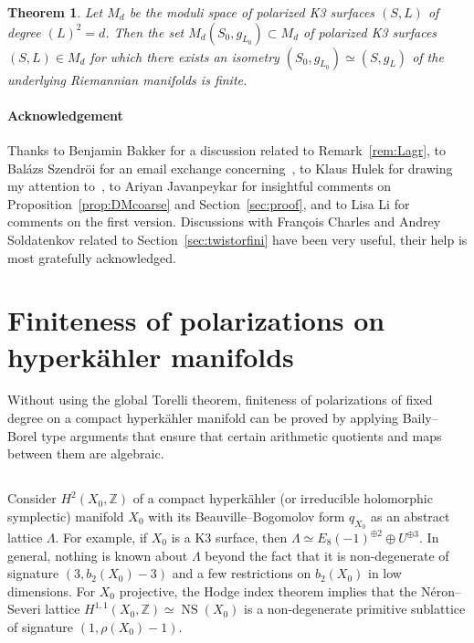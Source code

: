 \documentclass[11pt]{article}
\newtheorem{theo}{Theorem}[section]
\theoremstyle{definition}
\numberwithin{equation}{section}
\numberwithin{figure}{section}
\numberwithin{table}{section}
\DeclareMathOperator{\NS}{NS}
\newcommand{\ZZ}{\mathbb{Z}}
\renewcommand{\cong}{\simeq}
\begin{document}
\begin{theo}
Let $M_d$ be the moduli space of polarized K3 surfaces $(S,L)$ of degree $(L)^2=d$. Then the set $M_d(S_0,g_{L_0})\subset M_d$ of polarized K3 surfaces $(S,L)\in M_d$ for which there exists an isometry $(S_0,g_{L_0})\cong (S,g_L)$ of the underlying Riemannian manifolds is finite.
\end{theo}

\paragraph*{Acknowledgement}
Thanks to Benjamin Bakker for a discussion related to Remark~\ref{rem:Lagr}, to Bal\'azs Szendr\"oi for an email exchange concerning~\cite{Szendroi}, to Klaus Hulek for drawing my attention to~\cite{La}, to Ariyan Javanpeykar for insightful comments on Proposition~\ref{prop:DMcoarse} and Section~\ref{sec:proof}, and to Lisa Li for comments on the first version. Discussions with Fran\c{c}ois Charles and Andrey Soldatenkov related to Section~\ref{sec:twistorfini} have been very useful, their help is most gratefully acknowledged.


\section{Finiteness of polarizations on hyperk\"ahler manifolds}\label{sec:FinHK}

Without using the global Torelli theorem, finiteness of polarizations of fixed degree on a compact hyperk\"ahler manifold can be proved by applying Baily--Borel type arguments that ensure that certain arithmetic quotients and maps between them are algebraic.

\subsection{}
Consider $H^2(X_0,\ZZ)$ of a compact hyperk\"ahler (or irreducible holomorphic symplectic) mani\-fold $X_0$ with its Beauville--Bogomolov form $q_{X_0}$ as an abstract lattice $\Lambda$. For example, if $X_0$ is a K3 surface, then $\Lambda\cong E_8(-1)^{\oplus 2}\oplus U^{\oplus 3}$. In general, nothing is known about $\Lambda$ beyond the fact that it is non-degenerate of signature $(3,b_2(X_0)-3)$ and a few restrictions on $b_2(X_0)$ in low dimensions. For $X_0$ projective, the Hodge index theorem implies that the N\'eron--Severi lattice $H^{1,1}(X_0,\ZZ)\cong\NS(X_0)$ is a non-degenerate primitive sublattice of signature $(1,\rho(X_0)-1)$.
\end{document}
